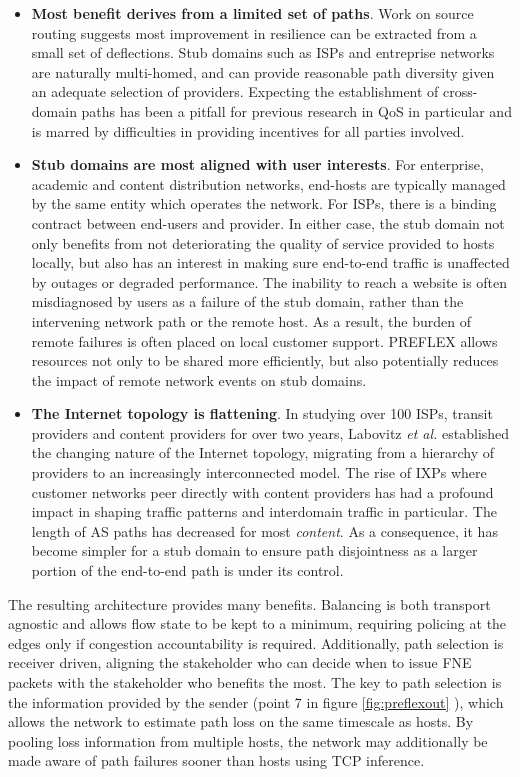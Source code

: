 \begin{itemize}
\item{
    \textbf{Most benefit derives from a limited set of paths}.
    Work on source routing \cite{Gummadi:2004p131,Yang:2006p405} suggests most improvement in resilience can be extracted from a small set of deflections.
    Stub domains such as \acp{ISP} and entreprise networks are naturally multi-homed, and can provide reasonable path diversity given an adequate selection of providers.
    Expecting the establishment of cross-domain paths has been a pitfall for previous research in \ac{QoS} in particular and is marred by difficulties in providing incentives for all parties involved.
}
\item{
    \textbf{Stub domains are most aligned with user interests}. 
    For enterprise, academic and content distribution networks, end-hosts are typically managed by the same entity which operates the network.
    For \acp{ISP}, there is a binding contract between end-users and provider.
    In either case, the stub domain not only benefits from not deteriorating the quality of service provided to hosts locally, but also has an interest in making sure end-to-end traffic is unaffected by outages or degraded performance.
    The inability to reach a website is often misdiagnosed by users as a failure of the stub domain, rather than the intervening network path or the remote host.
    As a result, the burden of remote failures is often placed on local customer support.
    \ac{PREFLEX} allows resources not only to be shared more efficiently, but also potentially reduces the impact of remote network events on stub domains.
}

\item{
    \textbf{The Internet topology is flattening}. 
    In studying over 100 \acp{ISP}, transit providers and content providers for over two years, Labovitz \emph{et al.} \cite{Labovitz:2010p175} established the changing nature of the Internet topology, migrating from a hierarchy of providers to an increasingly interconnected model.
    The rise of \acp{IXP} where customer networks peer directly with content providers has had a profound impact in shaping traffic patterns and interdomain traffic in particular.
    The length of \ac{AS} paths has decreased for most \emph{content}.
    As a consequence, it has become simpler for a stub domain to ensure path disjointness as a larger portion of the end-to-end path is under its control.
}
\end{itemize}

The resulting architecture provides many benefits. 
Balancing is both transport agnostic and allows flow state to be kept to a minimum, requiring policing at the edges only if congestion accountability is required. 
Additionally, path selection is receiver driven, aligning the stakeholder who can decide when to issue \ac{FNE} packets with the stakeholder who benefits the most. 
The key to path selection is the information provided by the sender (point 7 in figure \ref{fig:preflexout} ), which allows the network to estimate path loss on the same timescale as hosts. 
By pooling loss information from multiple hosts, the network may additionally be made aware of path failures sooner than hosts using \ac{TCP} inference.

